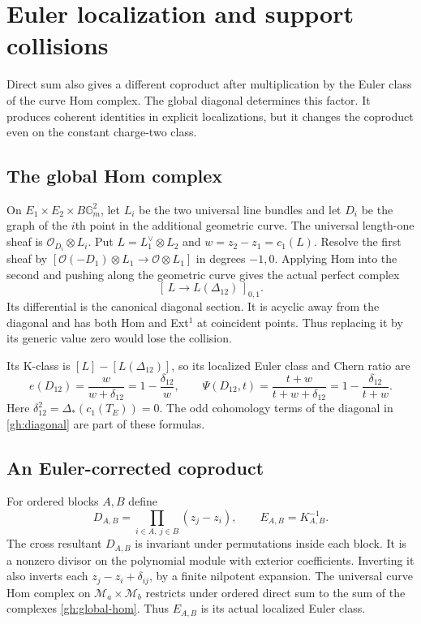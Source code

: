 \section{Euler localization and support collisions}
\label{sec:elliptic-hall-localization}

Direct sum also gives a different coproduct after multiplication by
the Euler class of the curve Hom complex. The global diagonal
determines this factor. It produces coherent identities in explicit
localizations, but it changes the coproduct even on the constant
charge-two class.

\subsection{The global Hom complex}

On $E_1\times E_2\times B\mathbb G_m^2$, let $L_i$ be the two
universal line bundles and let $D_i$ be the graph of the $i$th point
in the additional geometric curve. The universal length-one sheaf
is $\mathcal O_{D_i}\otimes L_i$.
Put $L=L_1^\vee\otimes L_2$ and $w=z_2-z_1=c_1(L)$.
Resolve the first sheaf by
$[\mathcal O(-D_1)\otimes L_1\to\mathcal O\otimes L_1]$ in
degrees $-1,0$. Applying Hom into the second and pushing along the
geometric curve gives the actual perfect complex
\begin{equation}\label{gh:global-hom}
 [\,L\longrightarrow L(\Delta_{12})\,]_{0,1}.
\end{equation}
Its differential is the canonical diagonal section. It is acyclic
away from the diagonal and has both Hom and Ext$^1$ at coincident
points. Thus replacing it by its generic value zero would lose the
collision.

Its K-class is $[L]-[L(\Delta_{12})]$, so its localized Euler class
and Chern ratio are
\begin{equation}\label{gh:euler}
 e(D_{12})=\frac{w}{w+\delta_{12}}
        =1-\frac{\delta_{12}}w,\qquad
 \Psi(D_{12},t)=\frac{t+w}{t+w+\delta_{12}}
        =1-\frac{\delta_{12}}{t+w}.
\end{equation}
Here $\delta_{12}^2=\Delta_*(c_1(T_E))=0$.
The odd cohomology terms of the diagonal in
\eqref{gh:diagonal} are part of these formulas.

\subsection{An Euler-corrected coproduct}

For ordered blocks $A,B$ define
\[
 D_{A,B}=\prod_{i\in A,\ j\in B}(z_j-z_i),\qquad
 E_{A,B}=K_{A,B}^{-1}.
\]
The cross resultant $D_{A,B}$ is invariant under permutations
inside each block. It is a nonzero divisor on the polynomial
module with exterior coefficients. Inverting it also inverts
each $z_j-z_i+\delta_{ij}$, by a finite nilpotent expansion.
The universal curve Hom complex on
$\mathcal M_a\times\mathcal M_b$ restricts under ordered direct
sum to the sum of the complexes \eqref{gh:global-hom}.
Thus $E_{A,B}$ is its actual localized Euler class.

